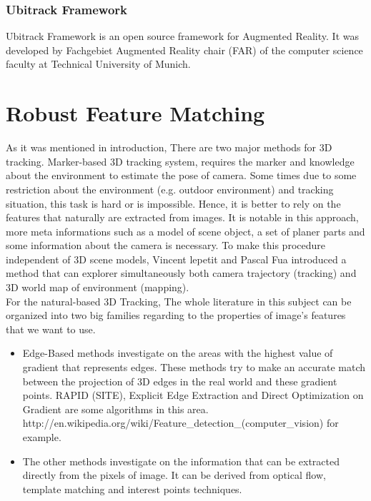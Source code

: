 \subsection{Ubitrack Framework}
Ubitrack Framework is an open source framework for Augmented Reality. It was developed by Fachgebiet Augmented Reality chair (FAR) of the computer science faculty at Technical University of Munich.

\chapter{Robust Feature Matching}\label{chapter:Robust Feature Matching}
As it was mentioned in introduction, There are two major methods for 3D tracking. Marker-based 3D tracking system, requires the marker and knowledge about the environment to estimate the pose of camera. Some times due to some restriction about the environment (e.g. outdoor environment) and tracking situation, this task is hard or is impossible. Hence, it is better to rely on the features that naturally are extracted from images. It is notable in this approach, more meta informations such as a model of scene object, a set of planer parts and some information about the camera is necessary. To make this procedure independent of 3D scene models, Vincent lepetit and Pascal Fua \cite{lepetit2005monocular} introduced a method that can explorer simultaneously both camera trajectory (tracking) and 3D world map of environment (mapping). \\
For the natural-based 3D Tracking, The whole literature in this subject can be organized into two big families regarding to the properties of image's features that we want to use.
\begin{itemize}
\item Edge-Based methods investigate on the areas with the highest value of gradient that represents edges. These methods try to make an accurate match between the projection of 3D edges in the real world and these gradient points. RAPID (SITE), Explicit Edge Extraction and Direct Optimization on Gradient are some algorithms in this area. 
http://en.wikipedia.org/wiki/Feature_detection_(computer_vision) for example.
\item The other methods investigate on the information that can be extracted directly from the pixels of image. It can be derived from optical flow, template matching and interest points techniques.
\end{itemize}

